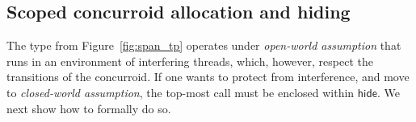 

\subsection{Scoped concurroid allocation and hiding}

The  type from Figure~\ref{fig:span_tp} operates under
\emph{open-world assumption} that  runs in an environment
of interfering threads, which, however, respect the transitions of the
 concurroid. If one wants to protect  from
interference, and move to \emph{closed-world assumption}, the top-most
call must be enclosed within $\mathsf{hide}$. We next show how to
formally do so.

